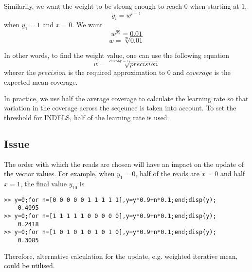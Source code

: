 \documentclass[12pt]{article}\usepackage[]{graphicx}\usepackage[]{color}
\begin{document}
Similarily, we want the weight to be strong enough to reach $0$ when starting at $1$.
\begin{equation*}
y_{i}=w^{i-1}
\end{equation*}
when $y_{1}=1$ and $x=0$.
We want
\begin{equation*}
w^{99}=0.01
\end{equation*}
\begin{equation*}
w=\sqrt[99]{0.01}
\end{equation*}

In other words, to find the weight value, one can use the following equation
\begin{equation*}
w=\sqrt[coverage-1]{precision}
\end{equation*}
wherer the $precision$ is the required approximation to $0$ and $coverage$ is the expected mean coverage.

In practice, we use half the average coverage to calculate the learning rate so that variation in the coverage across the seqeunce is taken into account.
To set the threshold for INDELS, half of the learning rate is used.


\subsection{Issue}
The order with which the reads are chosen will have an impact on the update of the vector values.
For example, when $y_{1}=0$, half of the reads are $x=0$ and half $x=1$, the final value $y_{10}$ is
\begin{verbatim}
>> y=0;for n=[0 0 0 0 0 1 1 1 1 1],y=y*0.9+n*0.1;end;disp(y);
    0.4095
>> y=0;for n=[1 1 1 1 1 0 0 0 0 0],y=y*0.9+n*0.1;end;disp(y);
    0.2418
>> y=0;for n=[1 0 1 0 1 0 1 0 1 0],y=y*0.9+n*0.1;end;disp(y);
    0.3085
\end{verbatim}
Therefore, alternative calculation for the update, e.g. weighted iterative mean, could be utilised.
\end{document}
